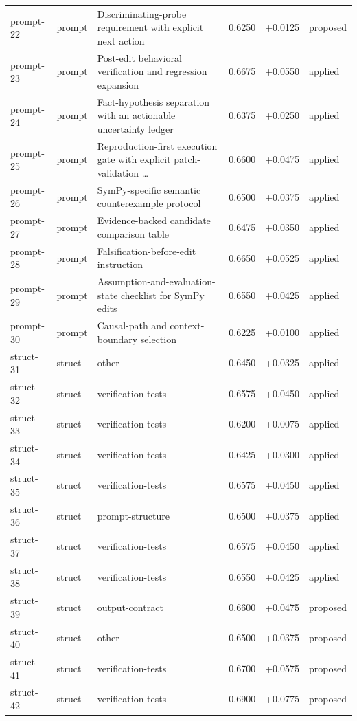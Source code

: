 \begin{center}
\begin{longtable}{llp{5.2cm}rrl}
prompt-22 & prompt & Discriminating-probe requirement with explicit next action & 0.6250 & +0.0125 & proposed \\
prompt-23 & prompt & Post-edit behavioral verification and regression expansion & 0.6675 & +0.0550 & applied \\
prompt-24 & prompt & Fact-hypothesis separation with an actionable uncertainty ledger & 0.6375 & +0.0250 & applied \\
prompt-25 & prompt & Reproduction-first execution gate with explicit patch-validation \ldots{} & 0.6600 & +0.0475 & applied \\
prompt-26 & prompt & SymPy-specific semantic counterexample protocol & 0.6500 & +0.0375 & applied \\
prompt-27 & prompt & Evidence-backed candidate comparison table & 0.6475 & +0.0350 & applied \\
prompt-28 & prompt & Falsification-before-edit instruction & 0.6650 & +0.0525 & applied \\
prompt-29 & prompt & Assumption-and-evaluation-state checklist for SymPy edits & 0.6550 & +0.0425 & applied \\
prompt-30 & prompt & Causal-path and context-boundary selection & 0.6225 & +0.0100 & applied \\
struct-31 & struct & other & 0.6450 & +0.0325 & applied \\
struct-32 & struct & verification-tests & 0.6575 & +0.0450 & applied \\
struct-33 & struct & verification-tests & 0.6200 & +0.0075 & applied \\
struct-34 & struct & verification-tests & 0.6425 & +0.0300 & applied \\
struct-35 & struct & verification-tests & 0.6575 & +0.0450 & applied \\
struct-36 & struct & prompt-structure & 0.6500 & +0.0375 & applied \\
struct-37 & struct & verification-tests & 0.6575 & +0.0450 & applied \\
struct-38 & struct & verification-tests & 0.6550 & +0.0425 & applied \\
struct-39 & struct & output-contract & 0.6600 & +0.0475 & proposed \\
struct-40 & struct & other & 0.6500 & +0.0375 & proposed \\
struct-41 & struct & verification-tests & 0.6700 & +0.0575 & proposed \\
struct-42 & struct & verification-tests & 0.6900 & +0.0775 & proposed \\

\end{longtable}
\end{center}
